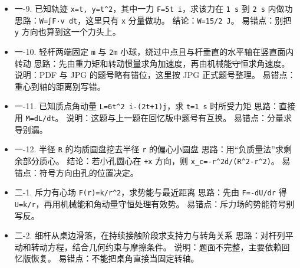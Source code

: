 \documentclass[12pt,a4paper]{ctexart}
\begin{document}
\begin{itemize}

\item 一-9. 已知轨迹 \texttt{x=t, y=t\textasciicircum{}2}，其中一力 \texttt{F=5t i}，求该力在 \texttt{1 s} 到 \texttt{2 s} 内做功 思路：\texttt{W=∫F·v dt}，这里只有 \texttt{x} 分量做功。 结论：\texttt{W=15/2 J}。 易错点：别把 \texttt{y} 方向也算到这一个力头上。

\end{itemize}

\begin{itemize}

\item 一-10. 轻杆两端固定 \texttt{m} 与 \texttt{2m} 小球，绕过中点且与杆垂直的水平轴在竖直面内转动 思路：先由重力矩和转动惯量求角加速度，再由机械能守恒求角速度。 说明：PDF 与 JPG 的题号略有错位，这里按 JPG 正式题号整理。 易错点：重心到轴的距离别写错。

\end{itemize}

\begin{itemize}

\item 一-11. 已知质点角动量 \texttt{L=6t\textasciicircum{}2 i-(2t+1)j}，求 \texttt{t=1 s} 时所受力矩 思路：直接用 \texttt{M=dL/dt}。 说明：这题与上一题在回忆版中题号有互换。 易错点：分量求导别漏。

\end{itemize}

\begin{itemize}

\item 一-12. 半径 \texttt{R} 的均质圆盘挖去半径 \texttt{r} 的偏心小圆盘 思路：用“负质量法”求剩余部分质心。 结论：若小孔圆心在 \texttt{+x} 方向，则 \texttt{x\_c=-r\textasciicircum{}2d/(R\textasciicircum{}2-r\textasciicircum{}2)}。 易错点：符号方向由孔的位置决定。

\end{itemize}

\begin{itemize}

\item 二-1. 斥力有心场 \texttt{F(r)=k/r\textasciicircum{}2}，求势能与最近距离 思路：先由 \texttt{F=-dU/dr} 得 \texttt{U=k/r}，再用机械能和角动量守恒处理有效势。 易错点：斥力场的势能符号别写反。

\end{itemize}

\begin{itemize}

\item 二-2. 细杆从桌边滑落，在持续接触阶段求支持力与转角关系 思路：对杆列平动和转动方程，结合几何约束与摩擦条件。 说明：题面不完整，主要依赖回忆版恢复。 易错点：不能把桌角直接当固定转轴。

\end{itemize}
\end{document}
